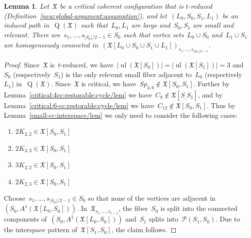 \documentclass[english,a4paper]{article}
\theoremstyle{plain}
\newtheorem{lemma}      [theorem]{Lemma}
\theoremstyle{definition}
\newcommand{\coherentConfig}{\ensuremath{\mathfrak{X}}}
\newcommand{\interspace}[2]{\ensuremath{\coherentConfig[#1,#2]}}
\newcommand{\inducedCC}[1]{\ensuremath{\coherentConfig[#1]}}
\DeclareMathOperator*{\ul}{ul}
\newcommand{\arcs}{\ensuremath{A}}
\DeclareMathOperator*{\Quotient}{Q}
\newcommand{\quotientGraph}[1]{\ensuremath{\Quotient(#1)}}
\newcommand{\equivalenceClasses}[1]{\ensuremath{\mathcal{P}(#1)}}
\newcommand{\clique}[1]{\ensuremath{K_{#1}}}
\newcommand{\cycle}[1]{\ensuremath{C_{#1}}}
\newcommand{\disjointCliques}[2]{\ensuremath{#1 \clique{#2}}}
\newcommand{\interspaceFourSix}{\ensuremath{Sp_{4,6}}}
\begin{document}
\begin{lemma}
\label{global-argument:LSSL/lem}
    Let~$\coherentConfig$ be a critical coherent configuration that is $t$-reduced (Definition~\ref{new:global-argument:assumption}), and let~$(L_0 ,S_0 ,S_1, L_1)$ be an induced path in~$\quotientGraph{\coherentConfig}$ such that~$L_0, L_1$ are large and~$S_0, S_1$ are small and relevant.
    There are~$s_{1},\dots,s_{|S_0|/2 -1} \in S_0$ such that vertex sets~$L_0 \cup S_0$ and~$L_1 \cup S_1$ are homogeneously connected in~$(\coherentConfig[L_0 \cup S_0 \cup S_1 \cup L_1])_{s_1,\dots,s_{|S_0|/2-1}}$.
\end{lemma}
\begin{proof}
    Since~$\coherentConfig$ is~$t$-reduced, we have~$|\ul(\inducedCC{S_0})| = |\ul(\inducedCC{S_1})| = 3$ and~$S_0$ (respectively~$S_1$) is the only relevant small fiber adjacent to~$L_0$ (respectively~$L_1$) in~$\quotientGraph{\coherentConfig}$.
    Since~$\coherentConfig$ is critical, we have~$\interspaceFourSix \notin \interspace{S_0}{S_1}$.
    Further by Lemma~\ref{critical:4cc:restorable:cycle/lem} we have~$\cycle{8} \notin \interspace{S_}{S_1}$, and by Lemma~\ref{critical:6-cc:restorable:cycle/lem} we have~$\cycle{12} \notin \interspace{S_0}{S_1}$.
    Thus by Lemma~\ref{small-cc:interspace/lem} we only need to consider the following cases:
    \begin{multicols}{2}
        \begin{enumerate}
            \item $\disjointCliques{2}{2,2} \in \interspace{S_0}{S_1}$
            \item $\disjointCliques{2}{3,3} \in \interspace{S_0}{S_1}$
            \item $\disjointCliques{3}{2,2} \in \interspace{S_0}{S_1}$
            \item $\disjointCliques{2}{2,3} \in \interspace{S_0}{S_1}$
        \end{enumerate}
    \end{multicols}
    Choose~$s_{1},\dots,s_{|S_0|/2 -1} \in S_0$ so that none of the vertices are adjacent in~$(S_0,\arcs^1(\interspace{L_0}{S_0}))$.
    In~$\coherentConfig_{s_1,\dots,s_{x-1}}$, the fiber~$S_0$ is split into the connected components of~$(S_0,\arcs^1(\interspace{L_0}{S_0}))$ and~$S_1$ splits into~$\equivalenceClasses{S_1,S_0}$.
    Due to the interspace pattern of~$\interspace{S_1}{S_0}$, the claim follows.
\end{proof}
\end{document}
